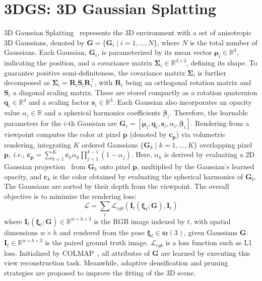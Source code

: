 \section{3DGS: 3D Gaussian Splatting}
\label{sec:3dgs}
3D Gaussian Splatting~\cite{kerbl20233d} represents the 3D environment with a set of anisotropic 3D Gaussians, denoted by $\mathbf{G}=\{\mathbf{G}_i \mid i = 1, \ldots, N\}$, where $N$ is the total number of Gaussians. Each Gaussian, $\mathbf{G}_i$, is parameterized by its mean vector $\boldsymbol{\mu}_i \in \mathbb{R}^{3}$, indicating the position, and a covariance matrix $\boldsymbol{\Sigma}_i \in \mathbb{R}^{3 \times 3}$, defining its shape. 
To guarantee positive semi-definiteness, the covariance matrix $\boldsymbol{\Sigma}_i$ is further decomposed as $\boldsymbol{\Sigma}_i = \mathbf{R}_i\mathbf{S}_i\mathbf{R}_i^\top$, with $\mathbf{R}_i$ being an orthogonal rotation matrix and $\mathbf{S}_i$ a diagonal scaling matrix. These are stored compactly as a rotation quaternion $\mathbf{q}_i \in \mathbb{R}^4$ and a scaling factor $\mathbf{s}_i \in \mathbb{R}^3$. Each Gaussian also incorporates an opacity value $\alpha_i \in \mathbb{R}$ and a spherical harmonics coefficients $\boldsymbol{\beta}_i$. Therefore, the learnable parameters for the $i$-th Gaussian are $\mathbf{G}_i = [ \boldsymbol{\mu}_i, \mathbf{q}_i, \mathbf{s}_i, \alpha_i, \boldsymbol{\beta}_i ]$. Rendering from a viewpoint computes the color at pixel $\mathbf{p}$ (denoted by $\mathbf{c_p}$) via volumetric rendering, integrating $K$ ordered Gaussians $\{\mathbf{G}_k \mid k = 1, \ldots, K\}$ overlapping pixel $\mathbf{p}$, \textit{i.e.}, $\mathbf{c_p} = \sum_{k=1}^{K} \mathbf{c}_k \alpha_k \prod_{j=1}^{k-1} (1 - \alpha_j)$. Here, $\alpha_k$ is derived by evaluating a 2D Gaussian projection~\cite{zwicker2002ewa} from $\mathbf{G}_k$ onto pixel $\mathbf{p}$, multiplied by the Gaussian's learned opacity, and $\mathbf{c}_k$ is the color obtained by evaluating the spherical harmonics of $\mathbf{G}_k$. The Gaussians are sorted by their depth from the viewpoint. The overall objective is to minimize the rendering loss:
\begin{equation}
\mathcal{L} = \sum_t \mathcal{L}_{rgb} ( \mathbf{I}_t(\boldsymbol{\xi}_t;\mathbf{G}) , \mathbf{I}_t )
\end{equation}
where $\mathbf{I}_t(\boldsymbol{\xi}_t; \mathbf{G}) \in \mathbb{R}^{w\times h\times 3}$ is the RGB image indexed by $t$, with spatial dimensions $w\times h$ and rendered from the pose $\boldsymbol{\xi}_t \in \mathfrak{se}(3)$, given Gaussians $\mathbf{G}$. $\mathbf{I}_t \in \mathbb{R}^{w\times h\times 3}$ is the paired ground truth image. $\mathcal{L}_{rgb}$ is a loss function such as L1 loss. Initialized by COLMAP~\cite{schonberger2016structure}, all attributes of $\mathbf{G}$ are learned by executing this view reconstruction task. Meanwhile, adaptive densification and pruning strategies are proposed to improve the fitting of the 3D scene.


